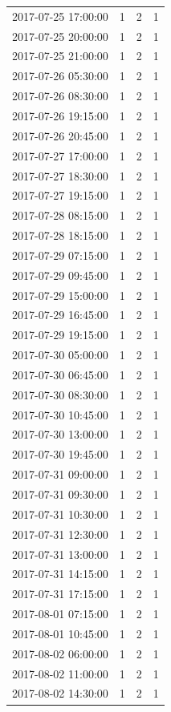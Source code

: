 \begin{tabular}{lrrr}
2017-07-25 17:00:00 & 1 & 2 & 1 \\
2017-07-25 20:00:00 & 1 & 2 & 1 \\
2017-07-25 21:00:00 & 1 & 2 & 1 \\
2017-07-26 05:30:00 & 1 & 2 & 1 \\
2017-07-26 08:30:00 & 1 & 2 & 1 \\
2017-07-26 19:15:00 & 1 & 2 & 1 \\
2017-07-26 20:45:00 & 1 & 2 & 1 \\
2017-07-27 17:00:00 & 1 & 2 & 1 \\
2017-07-27 18:30:00 & 1 & 2 & 1 \\
2017-07-27 19:15:00 & 1 & 2 & 1 \\
2017-07-28 08:15:00 & 1 & 2 & 1 \\
2017-07-28 18:15:00 & 1 & 2 & 1 \\
2017-07-29 07:15:00 & 1 & 2 & 1 \\
2017-07-29 09:45:00 & 1 & 2 & 1 \\
2017-07-29 15:00:00 & 1 & 2 & 1 \\
2017-07-29 16:45:00 & 1 & 2 & 1 \\
2017-07-29 19:15:00 & 1 & 2 & 1 \\
2017-07-30 05:00:00 & 1 & 2 & 1 \\
2017-07-30 06:45:00 & 1 & 2 & 1 \\
2017-07-30 08:30:00 & 1 & 2 & 1 \\
2017-07-30 10:45:00 & 1 & 2 & 1 \\
2017-07-30 13:00:00 & 1 & 2 & 1 \\
2017-07-30 19:45:00 & 1 & 2 & 1 \\
2017-07-31 09:00:00 & 1 & 2 & 1 \\
2017-07-31 09:30:00 & 1 & 2 & 1 \\
2017-07-31 10:30:00 & 1 & 2 & 1 \\
2017-07-31 12:30:00 & 1 & 2 & 1 \\
2017-07-31 13:00:00 & 1 & 2 & 1 \\
2017-07-31 14:15:00 & 1 & 2 & 1 \\
2017-07-31 17:15:00 & 1 & 2 & 1 \\
2017-08-01 07:15:00 & 1 & 2 & 1 \\
2017-08-01 10:45:00 & 1 & 2 & 1 \\
2017-08-02 06:00:00 & 1 & 2 & 1 \\
2017-08-02 11:00:00 & 1 & 2 & 1 \\
2017-08-02 14:30:00 & 1 & 2 & 1 \\

\end{tabular}
